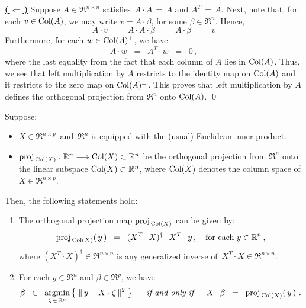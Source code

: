 \vskip 0.2cm
\noindent
\underline{\textbf{(\,$\Longleftarrow$\,)}}\quad
Suppose $A \in \Re^{n \times n}$ satisfies \,$A \cdot A \,=\, A$ and $A^{T} \,=\, A$.
Next, note that, for each $v \in \textnormal{Col}(A)$, we may write $v = A\cdot\beta$, for some $\beta\in\Re^{n}$.
Hence,
\begin{equation*}
A \cdot v
\;\;=\;\;
	A \cdot A \cdot \beta 
\;\;=\;\;
	A \cdot \beta 
\;\;=\;\;
	v
\end{equation*}
Furthermore, for each $w \in \textnormal{Col}(A)^{\perp}$, we have
\begin{equation*}
A \cdot w \;\;= \;\;A^{T} \cdot w \;\;=\;\; 0\,,
\end{equation*}
where the last equality from the fact that each column of $A$ lies in $\textnormal{Col}(A)$.
Thus, we see that left multiplication by $A$ restricts to the identity map on $\textnormal{Col}(A)$
and it restricts to the zero map on $\textnormal{Col}(A)^{\perp}$. This proves that left multiplication
by $A$ defines the orthogonal projection from $\Re^{n}$ onto $\textnormal{Col}(A)$.
\qed

\begin{proposition}
\mbox{}\vskip 0.1cm\noindent
Suppose:
\begin{itemize}
\item
	$X \in \Re^{n \times p}$\, and \,$\Re^{n}$ is equipped with the (usual) Euclidean inner product.
\item
	$\textnormal{proj}_{\,\textnormal{Col}(X)} : \mathbb{R}^{n} \longrightarrow \textnormal{Col}(X) \subset \mathbb{R}^{n}$
	be the orthogonal projection from $\Re^{n}$ onto the linear subspace $\textnormal{Col}(X) \subset \mathbb{R}^{n}$,
	where $\textnormal{Col}(X)$ denotes the column space of $X \in \Re^{n \times p}$.
\end{itemize}
Then, the following statements hold:
\begin{enumerate}
\item
	The orthogonal projection map $\textnormal{proj}_{\,\textnormal{Col}(X)}$ can be given by:
	\begin{equation*}
	\textnormal{proj}_{\,\textnormal{Col}(X)}(\,y\,) \;\; = \;\; (X^{T}\cdot X)^{\dagger} \cdot X^{T} \cdot y\,,
	\quad
	\textnormal{for each $y \in \mathbb{R}^{n}$}\,,
	\end{equation*}
	where $(X^{T}\cdot X)^{\dagger} \in \Re^{n \times n}$ is any generalized inverse of
	\,$X^{T} \cdot X \in \Re^{n \times n}$.
\item
	For each $y \in \Re^{n}$ and $\beta \in \Re^{p}$, we have
	\begin{equation*}
	\beta \;\;\in\;\; \underset{\zeta\,\in\,\mathbb{R}^{p}}{\textnormal{argmin}}\left\{\;\Vert\,y - X \cdot \zeta\,\Vert^{2}\;\right\}
	\quad\;\;\textnormal{\it if and only if}\quad\;\;
	X\cdot\beta \;\; = \;\; \textnormal{proj}_{\,\textnormal{Col}(X)}\!\left(\,y\,\right)\,.
	\end{equation*}
\end{enumerate}
\end{proposition}


